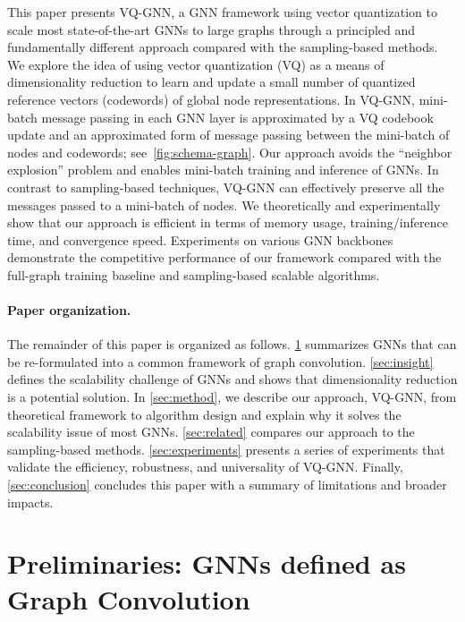 \documentclass{article}
\newcommand{\cm}{\paragraph}
\begin{document}
This paper presents VQ-GNN, a GNN framework using vector quantization to scale most state-of-the-art GNNs to large graphs through a principled and fundamentally different approach compared with the sampling-based methods. We explore the idea of using vector quantization (VQ) as a means of dimensionality reduction to learn and update a small number of quantized reference vectors (codewords) of global node representations. In VQ-GNN, mini-batch message passing in each GNN layer is approximated by a VQ codebook update and an approximated form of message passing between the mini-batch of nodes and codewords; see~\cref{fig:schema-graph}. Our approach avoids the ``neighbor explosion'' problem and enables mini-batch training and inference of GNNs. In contrast to sampling-based techniques, VQ-GNN can effectively preserve all the messages passed to a mini-batch of nodes. We theoretically and experimentally show that our approach is efficient in terms of memory usage, training/inference time, and convergence speed. Experiments on various GNN backbones demonstrate the competitive performance of our framework compared with the full-graph training baseline and sampling-based scalable algorithms.



\cm{Paper organization.}
The remainder of this paper is organized as follows. \cref{sec:background} summarizes GNNs that can be re-formulated into a common framework of graph convolution. \cref{sec:insight} defines the scalability challenge of GNNs and shows that dimensionality reduction is a potential solution. In \cref{sec:method}, we describe our approach, VQ-GNN, from theoretical framework to algorithm design and explain why it solves the scalability issue of most GNNs. \cref{sec:related} compares our approach to the sampling-based methods. \cref{sec:experiments} presents a series of experiments that validate the efficiency, robustness, and universality of VQ-GNN. Finally, \cref{sec:conclusion} concludes this paper with a summary of limitations and broader impacts.

%
 \section{Preliminaries: GNNs defined as Graph Convolution}
\label{sec:background}
\end{document}
